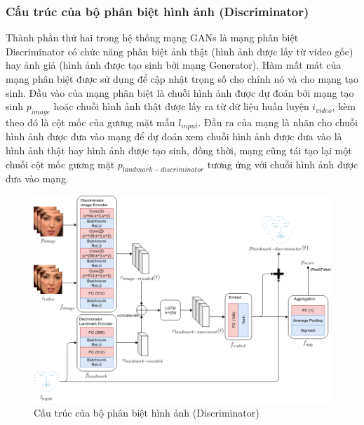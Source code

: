 \subsubsection{Cấu trúc của bộ phân biệt hình ảnh (Discriminator)}\label{sec:discriminator_detail}

Thành phần thứ hai trong hệ thống mạng GANs là mạng phân biệt Discriminator có chức năng phân biệt ảnh thật (hình ảnh được lấy từ video gốc) hay ảnh giả (hình ảnh được tạo sinh bởi mạng Generator). Hàm mất mát của mạng phân biệt được sử dụng để cập nhật trọng số cho chính nó và cho mạng tạo sinh. Đầu vào của mạng phân biệt là chuỗi hình ảnh được dự đoán bới mạng tạo sinh $p_{image}$ hoặc chuỗi hình ảnh thật được lấy ra từ dữ liệu huấn luyện $i_{video}$, kèm theo đó là cột mốc của gương mặt mẫu $l_{input}$. Đầu ra của mạng là nhãn cho chuỗi hình ảnh được đưa vào mạng để dự đoán xem chuỗi hình ảnh được đưa vào là hình ảnh thật hay hình ảnh được tạo sinh, đồng thời, mạng cũng tái tạo lại một chuỗi cột mốc gương mặt $p_{landmark-discriminator}$ tương ứng với chuỗi hình ảnh được đưa vào mạng.

\begin{figure}[H]
    \centering
    \includegraphics[width=15cm]{./content/materials/discriminator.png}
    \caption{Cấu trúc của bộ phân biệt hình ảnh (Discriminator)}
\end{figure}

